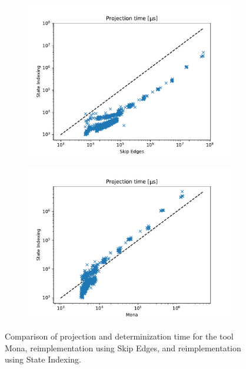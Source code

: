 \documentclass[pdflatex,sn-mathphys-num]{sn-jnl}%
\theoremstyle{thmstyleone}%
\theoremstyle{thmstyletwo}%
\theoremstyle{thmstylethree}%
\begin{document}
            \begin{figure}[h!]
                \centering
                \captionsetup[subfigure]{justification=centering}
                \begin{subfigure}{0.49\textwidth}
                    \includegraphics[width=\textwidth]{Figures/projection-first-mata.pdf}
                \end{subfigure}
                \begin{subfigure}{0.49\textwidth}
                    \includegraphics[width=\textwidth]{Figures/projection-first-mona.pdf}
                \end{subfigure}
                \label{figure:projection_first}
                \caption{Comparison of projection and determinization time for the tool Mona, reimplementation using Skip Edges, and reimplementation using State Indexing.}
            \end{figure}
\end{document}
